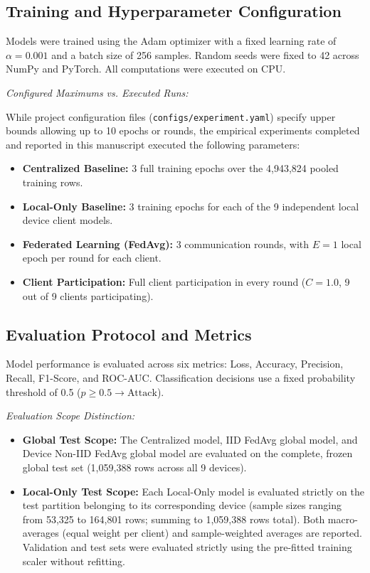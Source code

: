 \documentclass[11pt,a4paper]{article}
\begin{document}
\subsection{Training and Hyperparameter Configuration}
Models were trained using the Adam optimizer with a fixed learning rate of $\alpha = 0.001$ and a batch size of 256 samples. Random seeds were fixed to 42 across NumPy and PyTorch. All computations were executed on CPU.

\textit{Configured Maximums vs. Executed Runs:}

While project configuration files (\texttt{configs/experiment.yaml}) specify upper bounds allowing up to 10 epochs or rounds, the empirical experiments completed and reported in this manuscript executed the following parameters:

\begin{itemize}
    \item \textbf{Centralized Baseline:} 3 full training epochs over the 4,943,824 pooled training rows.
    \item \textbf{Local-Only Baseline:} 3 training epochs for each of the 9 independent local device client models.
    \item \textbf{Federated Learning (FedAvg):} 3 communication rounds, with $E = 1$ local epoch per round for each client.
    \item \textbf{Client Participation:} Full client participation in every round ($C = 1.0$, 9 out of 9 clients participating).
\end{itemize}

\subsection{Evaluation Protocol and Metrics}
Model performance is evaluated across six metrics: Loss, Accuracy, Precision, Recall, F1-Score, and ROC-AUC. Classification decisions use a fixed probability threshold of 0.5 ($p \ge 0.5 \rightarrow \text{Attack}$).

\textit{Evaluation Scope Distinction:}

\begin{itemize}
    \item \textbf{Global Test Scope:} The Centralized model, IID FedAvg global model, and Device Non-IID FedAvg global model are evaluated on the complete, frozen global test set (1,059,388 rows across all 9 devices).
    \item \textbf{Local-Only Test Scope:} Each Local-Only model is evaluated strictly on the test partition belonging to its corresponding device (sample sizes ranging from 53,325 to 164,801 rows; summing to 1,059,388 rows total). Both macro-averages (equal weight per client) and sample-weighted averages are reported. Validation and test sets were evaluated strictly using the pre-fitted training scaler without refitting.
\end{itemize}
\end{document}
